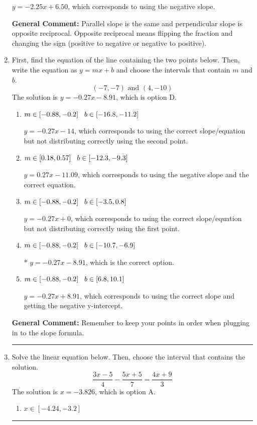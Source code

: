 \documentclass{extbook}[14pt]
\newcommand{\litem}[1]{\item #1

\rule{\textwidth}{0.4pt}}
\begin{document}
\begin{enumerate}
{\begin{enumerate}[label=\Alph*.]
 $y = -2.25x + 6.50$, which corresponds to using the negative slope.
\end{enumerate}

\textbf{General Comment:} Parallel slope is the same and perpendicular slope is opposite reciprocal. Opposite reciprocal means flipping the fraction and changing the sign (positive to negative or negative to positive).
}
\litem{
First, find the equation of the line containing the two points below. Then, write the equation as $ y=mx+b $ and choose the intervals that contain $m$ and $b$.
\[ (-7, -7) \text{ and } (4, -10) \]The solution is \( y = -0.27x -8.91 \), which is option D.\begin{enumerate}[label=\Alph*.]
\item \( m \in [-0.88, -0.2] \hspace*{3mm} b \in [-16.8, -11.2] \)

 $y = -0.27x -14$, which corresponds to using the correct slope/equation but not distributing correctly using the second point.
\item \( m \in [0.18, 0.57] \hspace*{3mm} b \in [-12.3, -9.3] \)

 $y = 0.27x -11.09$, which corresponds to using the negative slope and the correct equation.
\item \( m \in [-0.88, -0.2] \hspace*{3mm} b \in [-3.5, 0.8] \)

 $y = -0.27x + 0$, which corresponds to using the correct slope/equation but not distributing correctly using the first point.
\item \( m \in [-0.88, -0.2] \hspace*{3mm} b \in [-10.7, -6.9] \)

* $y = -0.27x -8.91$, which is the correct option.
\item \( m \in [-0.88, -0.2] \hspace*{3mm} b \in [6.8, 10.1] \)

 $y = -0.27x + 8.91$, which corresponds to using the correct slope and getting the negative y-intercept.
\end{enumerate}

\textbf{General Comment:} Remember to keep your points in order when plugging in to the slope formula.
}
\litem{
Solve the linear equation below. Then, choose the interval that contains the solution.
\[ \frac{3x -5}{4} - \frac{5x + 5}{7} = \frac{4x + 9}{3} \]The solution is \( x = -3.826 \), which is option A.\begin{enumerate}[label=\Alph*.]
\item \( x \in [-4.24, -3.2] \)


\end{enumerate}}
\end{enumerate}
\end{document}
